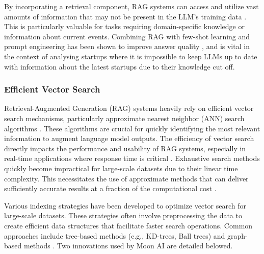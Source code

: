 \documentclass[a4paper, oneside]{discothesis}
\begin{document}
By incorporating a retrieval component, RAG systems can access and utilize vast amounts of information that may not be present in the LLM's training data \cite{lewis2020retrieval}. This is particularly valuable for tasks requiring domain-specific knowledge or information about current events.
Combining RAG with few-shot learning and prompt engineering has been shown to improve answer quality \cite{liu2021pre}, and is vital in the context of analysing startups where it is impossible to keep LLMs up to date with information about the latest startups due to their knowledge cut off.


\subsubsection{Efficient Vector Search}
Retrieval-Augmented Generation (RAG) systems heavily rely on efficient vector search mechanisms, particularly approximate nearest neighbor (ANN) search algorithms \cite{johnson2019billion}. These algorithms are crucial for quickly identifying the most relevant information to augment language model outputs. The efficiency of vector search directly impacts the performance and usability of RAG systems, especially in real-time applications where response time is critical \cite{lewis2020retrieval}. Exhaustive search methods quickly become impractical for large-scale datasets due to their linear time complexity. This necessitates the use of approximate methods that can deliver sufficiently accurate results at a fraction of the computational cost \cite{andoni2018approximate}.

Various indexing strategies have been developed to optimize vector search for large-scale datasets. These strategies often involve preprocessing the data to create efficient data structures that facilitate faster search operations. Common approaches include tree-based methods (e.g., KD-trees, Ball trees) and graph-based methods \cite{malkov2018efficient}. Two innovations used by Moon AI are detailed belowed.
\end{document}
